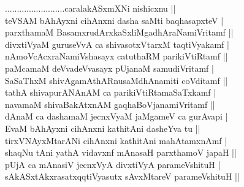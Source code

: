 \begin{entry}
\smallskip
\begin{shl}
.........................caralakASxmXNi nishicxnu ||\\[1pt]
teVSAM bAhAyxni cihAnxni dasha saMti baqhasapxteV |\\[1pt]
parxthamaM BasamxrudArxkaSxliMgadhAraNamiVritamf ||\\[1pt]
divxtiVyaM guruseVvA ca shivasotxVtarxM taqtiVyakamf |\\[1pt]
nAmoVcAcxraNamiVshasayx catuthaRM parikiVtiRtamf ||\\[1pt]
paMcamaM deVvadeVvasayx pUjanaM samudiVritamf |\\[1pt]
SaSaThxM shivAgamAthARnusaMdhAnamiti coVditamf ||\\[1pt]
tathA shivapurANAnAM ca parikiVtiRtamaSaTxkamf |\\[1pt]
navamaM shivaBakAtxnAM gaqhaBoVjanamiVritamf ||\\[1pt]
dAnaM ca dashamaM jecnxVyaM jaMgameV ca gurAvapi |\\[1pt]
EvaM bAhAyxni cihAnxni kathitAni dasheYva tu ||\\[1pt]
tirxVNAyxMtarANi cihAnxni kathitAni mahAtamxnAmf |\\[1pt]
shaqNu tAni yathA vidavxnf mAnasaH parxthamoV japaH ||\\[1pt]
pUjA ca mAnasiV jecnxVyA divxtiVyA parameVshituH |\\[1pt]
sAkASxtAkxrasatxqqtiVyasutx sAvxMtareV parameVshituH ||
\end{shl}
\medskip
{}
\end{entry}

